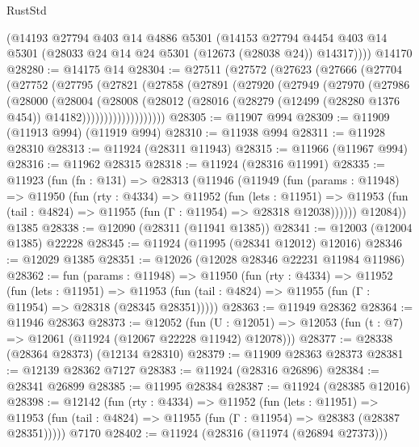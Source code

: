 \begin{lexlean}{RustStd}
\begin{coremodule}
{\begin{coremodule}
{{{{{{{{{{{{{{{{{{{{{{{{{{{{{{{{{{{{{{{{{{{{{{{{{{{{{{{{{{{{{{{{{{{{{{{{{{{{{{{{      (@14193
        @27794
        @403
        @14
        @4886
        @5301
        (@14153
          @27794
          @4454
          @403
          @14
          @5301
          (@28033 @24 @14 @24 @5301 (@12673 (@28038 @24)) @14317))))
    @14170
@28280 := @14175 @14
@28304 := @27511
    (@27572
      (@27623
        (@27666
          (@27704
            (@27752
              (@27795
                (@27821
                  (@27858
                    (@27891
                      (@27920
                        (@27949
                          (@27970
                            (@27986
                              (@28000
                                (@28004
                                  (@28008
                                    (@28012
                                      (@28016
                                        (@28279
                                          (@12499 (@28280 @1376 @454))
                                          @14182)))))))))))))))))))
@28305 := @11907 @994
@28309 := @11909 (@11913 @994) (@11919 @994)
@28310 := @11938 @994
@28311 := @11928 @28310
@28313 := @11924 (@28311 @11943)
@28315 := @11966 (@11967 @994)
@28316 := @11962 @28315
@28318 := @11924 (@28316 @11991)
@28335 := @11923
    (fun (fn : @131) =>
    @28313
      (@11946
        (@11949
          (fun (params : @11948) =>
          @11950
            (fun (rty : @4334) =>
            @11952
              (fun (lets : @11951) =>
              @11953 (fun (tail : @4824) => @11955 (fun (Γ : @11954) => @28318 @12038))))))
        @12084))
    @1385
@28338 := @12090 (@28311 (@11941 @1385))
@28341 := @12003 (@12004 @1385) @22228
@28345 := @11924 (@11995 (@28341 @12012) @12016)
@28346 := @12029 @1385
@28351 := @12026 (@12028 @28346 @22231 @11984 @11986)
@28362 := fun (params : @11948) =>
  @11950
    (fun (rty : @4334) =>
    @11952
      (fun (lets : @11951) =>
      @11953 (fun (tail : @4824) => @11955 (fun (Γ : @11954) => @28318 (@28345 @28351)))))
@28363 := @11949 @28362
@28364 := @11946 @28363
@28373 := @12052
    (fun (U : @12051) => @12053 (fun (t : @7) => @12061 (@11924 (@12067 @22228 @11942) @12078)))
@28377 := @28338 (@28364 @28373) (@12134 @28310)
@28379 := @11909 @28363 @28373
@28381 := @12139 @28362 @7127
@28383 := @11924 (@28316 @26896)
@28384 := @28341 @26899
@28385 := @11995 @28384
@28387 := @11924 (@28385 @12016)
@28398 := @12142
    (fun (rty : @4334) =>
    @11952
      (fun (lets : @11951) =>
      @11953 (fun (tail : @4824) => @11955 (fun (Γ : @11954) => @28383 (@28387 @28351)))))
    @7170
@28402 := @11924 (@28316 (@11974 (@26894 @27373)))
}}}}}}}}}}}}}}}}}}}}}}}}}}}}}}}}}}}}}}}}}}}}}}}}}}}}}}}}}}}}}}}}}}}}}}}}}}}}}}}}
\end{coremodule}}
\end{coremodule}
\end{lexlean}
